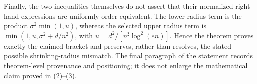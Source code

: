 Finally, the two inequalities themselves do not assert that their normalized right-hand expressions are uniformly order-equivalent.  The lower radius term is the product \(\sigma^2\min(1,u)\), whereas the selected upper radius term is \(\min(1,u,\sigma^2+d/n^2)\), with \(u=d^2/[n^2\log^2(en)]\).  Hence the theorem proves exactly the claimed bracket and preserves, rather than resolves, the stated possible shrinking-radius mismatch.  The final paragraph of the statement records theorem-level provenance and positioning; it does not enlarge the mathematical claim proved in (2)--(3).